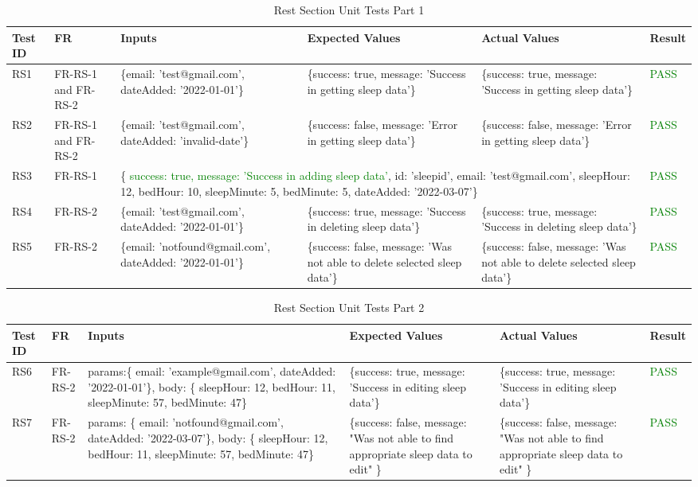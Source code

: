 \documentclass[12pt, titlepage]{article}
\begin{document}
\begin{table}[h]
\centering
\small
\begin{tabularx}{\textwidth}{|X|X|p{3cm}|p{2.5cm}|p{2.5cm}|X|}
	\hline
	Test ID & FR & Inputs & Expected Values & Actual Values & Result \\
	\hline
	RS1 & FR-RS-1 and FR-RS-2 & \{email: 'test@gmail.com', dateAdded: '2022-01-01'\}  & \{success: true, message: 'Success in getting sleep data'\} & \{success: true, message: 'Success in getting sleep data'\} & \textcolor{Green}{PASS} \\
	\hline
	RS2 & FR-RS-1 and FR-RS-2 & \{email: 'test@gmail.com', dateAdded: 'invalid-date'\}  & \{success: false, message: 'Error in getting sleep data'\} & \{success: false, message: 'Error in getting sleep data'\} & \textcolor{Green}{PASS} \\
	\hline
	RS3 & FR-RS-1 & \multicolumn{3}{p{8cm}|}{\centering \{ \textcolor{Green}{success: true, message: 'Success in adding sleep data'}, id: 'sleepid', email: 'test@gmail.com', sleepHour: 12, bedHour: 10, sleepMinute: 5, bedMinute: 5, dateAdded: '2022-03-07'\}}  &  \textcolor{Green}{PASS}\\
	\hline
	RS4 & FR-RS-2 & \{email: 'test@gmail.com', dateAdded: '2022-01-01'\}  & \{success: true, message: 'Success in deleting sleep data'\} & \{success: true, message: 'Success in deleting sleep data'\} & \textcolor{Green}{PASS} \\
	\hline
	RS5 & FR-RS-2 & \{email: 'notfound@gmail.com', dateAdded: '2022-01-01'\}  & \{success: false, message: 'Was not able to delete selected sleep data'\} & \{success: false, message: 'Was not able to delete selected sleep data'\} & \textcolor{Green}{PASS} \\
	\hline
\end{tabularx}
\caption{Rest Section Unit Tests Part 1}
\label{table:rest-unit-tests}
\end{table}

\newpage

\begin{table}[h]
\centering
\small
\begin{tabularx}{\textwidth}{|X|X|p{3cm}|p{2.5cm}|p{2.5cm}|X|}
	\hline
	Test ID & FR & Inputs & Expected Values & Actual Values & Result \\
	\hline
	RS6 & FR-RS-2 & params:\{ email: 'example@gmail.com', dateAdded: '2022-01-01'\},
	body: \{ sleepHour: 12, bedHour: 11, sleepMinute: 57, bedMinute: 47\}  & \{success: true, message: 'Success in editing sleep data'\} & \{success: true, message: 'Success in editing sleep data'\} & \textcolor{Green}{PASS} \\
	\hline
	RS7 & FR-RS-2 & params: \{ email: 'notfound@gmail.com', dateAdded: '2022-03-07'\},
	body: \{ sleepHour: 12, bedHour: 11, sleepMinute: 57, bedMinute: 47\}  & \{success: false, message: "Was not able to find appropriate sleep data to edit" \} & \{success: false, message: "Was not able to find appropriate sleep data to edit" \} & \textcolor{Green}{PASS} \\
	\hline
\end{tabularx}
\caption{Rest Section Unit Tests Part 2}
\label{table:rest-unit-tests2}
\end{table}
\end{document}
